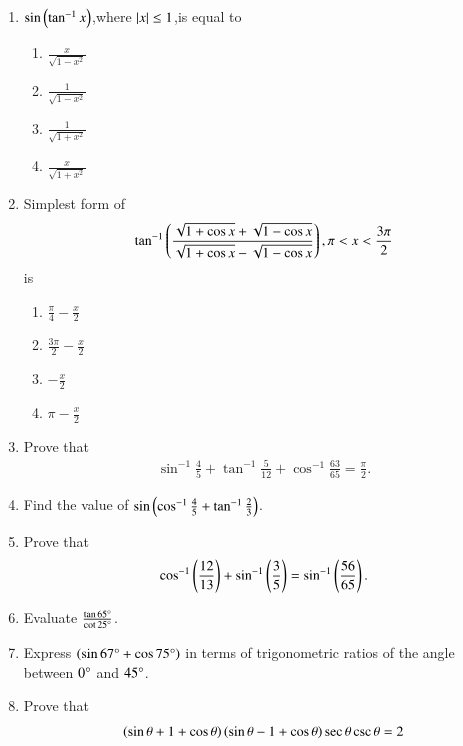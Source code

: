 \begin{enumerate}[label=\thesubsection.\arabic*,ref=\thesubsection.\theenumi,itemsep=1pt]
\hfill{}\item $ \sin\left(\tan^{-1}x\right)$,where $\left\vert x\right\vert \le 1 $,is equal to
\begin{multicols}{4}
\begin{enumerate}
\item$\frac{x}{\sqrt{1-x^2}}$
\item$\frac{1}{\sqrt{1-x^2}}$ 
\item$\frac{1}{\sqrt{1+x^2}}$
\item$\frac{x}{\sqrt{1+x^2}}$
\end{enumerate}
\end{multicols}  
\hfill{}\item Simplest form of $$ \tan^{-1}\left(\frac{\sqrt{1+\cos x}+\sqrt{1-\cos x}}{\sqrt{1+\cos x}- \sqrt {1- \cos x}}\right) , \pi < x < \frac{3\pi}{2}$$ is
\begin{multicols}{4}
\begin{enumerate}
  \item$\frac{\pi}{4} - \frac{x}{2}$
  \item$\frac{3\pi}{2} - \frac{x}{2}$
  \item$-\frac{x}{2}$
  \item${\pi} - \frac{x}{2}$
\end{enumerate}
\end{multicols}
\hfill{}
\item Prove that 
\begin{align*}
    \sin^{-1}\frac{4}{5}+\tan^{-1}\frac{5}{12}+\cos^{-1}\frac{63}{65}=\frac{\pi}{2}
.\end{align*}
\hfill{}
\item Find the value of $\sin\left(\cos^{-1}{\frac{4}{5}}+{\tan^{-1}{\frac{2}{3}}}\right)$.
\hfill{}
\item Prove that 
\begin{align*}
\cos^{-1}\left(\frac{12}{13}\right)+\sin^{-1}\left(\frac{3}{5}\right)=\sin^{-1} \left(\frac{56}{65}\right)
.\end{align*}
\hfill{}
\item  Evaluate
    $\frac {\tan 65\degree}  {\cot 25\degree}$.
\hfill{}\item Express $\left({\sin 67\degree}+ {\cos 75\degree}\right)$ in terms of trigonometric ratios of the angle between $0\degree$ and $45\degree$.
\hfill{}\item Prove that 
\begin{align*}
    \brak{\sin \theta+1+\cos \theta} \brak{\sin\theta-1+\cos\theta}\sec\theta \csc\theta=2

\end{align*}
\end{enumerate}
